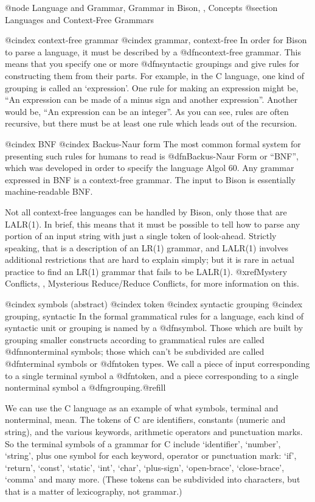 @node Language and Grammar, Grammar in Bison,  , Concepts
@section Languages and Context-Free Grammars

@cindex context-free grammar
@cindex grammar, context-free
In order for Bison to parse a language, it must be described by a
@dfn{context-free grammar}.  This means that you specify one or more
@dfn{syntactic groupings} and give rules for constructing them from their
parts.  For example, in the C language, one kind of grouping is called an
`expression'.  One rule for making an expression might be, ``An expression
can be made of a minus sign and another expression''.  Another would be,
``An expression can be an integer''.  As you can see, rules are often
recursive, but there must be at least one rule which leads out of the
recursion.

@cindex BNF
@cindex Backus-Naur form
The most common formal system for presenting such rules for humans to read
is @dfn{Backus-Naur Form} or ``BNF'', which was developed in order to
specify the language Algol 60.  Any grammar expressed in BNF is a
context-free grammar.  The input to Bison is essentially machine-readable
BNF.

Not all context-free languages can be handled by Bison, only those
that are LALR(1).  In brief, this means that it must be possible to
tell how to parse any portion of an input string with just a single
token of look-ahead.  Strictly speaking, that is a description of an
LR(1) grammar, and LALR(1) involves additional restrictions that are
hard to explain simply; but it is rare in actual practice to find an
LR(1) grammar that fails to be LALR(1).  @xref{Mystery Conflicts, ,
Mysterious Reduce/Reduce Conflicts}, for more information on this.

@cindex symbols (abstract)
@cindex token
@cindex syntactic grouping
@cindex grouping, syntactic
In the formal grammatical rules for a language, each kind of syntactic unit
or grouping is named by a @dfn{symbol}.  Those which are built by grouping
smaller constructs according to grammatical rules are called
@dfn{nonterminal symbols}; those which can't be subdivided are called
@dfn{terminal symbols} or @dfn{token types}.  We call a piece of input
corresponding to a single terminal symbol a @dfn{token}, and a piece
corresponding to a single nonterminal symbol a @dfn{grouping}.@refill

We can use the C language as an example of what symbols, terminal and
nonterminal, mean.  The tokens of C are identifiers, constants (numeric and
string), and the various keywords, arithmetic operators and punctuation
marks.  So the terminal symbols of a grammar for C include `identifier',
`number', `string', plus one symbol for each keyword, operator or
punctuation mark: `if', `return', `const', `static', `int', `char',
`plus-sign', `open-brace', `close-brace', `comma' and many more.  (These
tokens can be subdivided into characters, but that is a matter of
lexicography, not grammar.)

